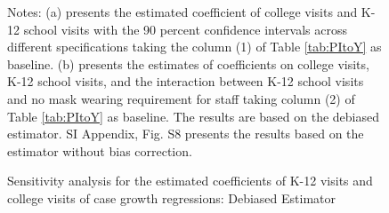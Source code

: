 \documentclass[9pt,twocolumn,twoside,lineno]{pnas-new}
\begin{document}
\begin{figure}[!ht]
  \caption{Sensitivity analysis for the estimated coefficients of K-12 visits and college visits of case growth regressions: Debiased Estimator \label{fig:sensitivity}}
\vspace{-0.2cm}   {\scriptsize
\begin{flushleft}
Notes:  (a) presents the estimated coefficient of college visits and K-12 school visits with the 90 percent confidence intervals across different specifications taking the column (1) of Table  \ref{tab:PItoY}  as baseline. (b) presents the estimates of coefficients on college visits, K-12 school visits, and the interaction between K-12 school visits and no mask wearing requirement for staff  taking column (2) of Table  \ref{tab:PItoY}  as baseline. The results are based on the debiased estimator.  SI Appendix, Fig. S8 presents the results based on the  estimator without bias correction.
\end{flushleft}  }
\end{figure}
\end{document}
